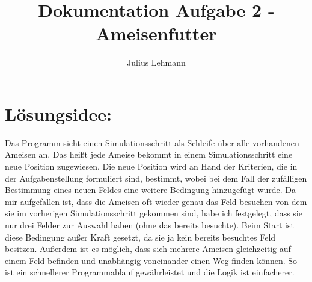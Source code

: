 \documentclass[a4paper,12pt]{scrartcl}
\title{Dokumentation Aufgabe 2 - Ameisenfutter}
\author{Julius Lehmann}
\begin{document}
\maketitle
\section*{Lösungsidee:}
Das Programm sieht einen Simulationsschritt als Schleife über alle vorhandenen Ameisen an. Das heißt jede Ameise bekommt in einem Simulationsschritt eine neue Position zugewiesen. Die neue Position wird an Hand der Kriterien, die in der Aufgabenstellung formuliert sind, bestimmt, wobei bei dem Fall der zufälligen Bestimmung eines neuen Feldes eine weitere Bedingung hinzugefügt wurde. Da mir aufgefallen ist, dass die Ameisen oft wieder genau das Feld besuchen von dem sie im vorherigen Simulationsschritt gekommen sind, habe ich festgelegt, dass sie nur drei Felder zur Auswahl haben (ohne das bereits besuchte). Beim Start ist diese Bedingung außer Kraft gesetzt, da sie ja kein bereits besuchtes Feld besitzen.
Außerdem ist es möglich, dass sich mehrere Ameisen gleichzeitig auf einem Feld befinden und unabhängig voneinander einen Weg finden können. So ist ein schnellerer Programmablauf gewährleistet und die Logik ist einfacherer.
\end{document}
